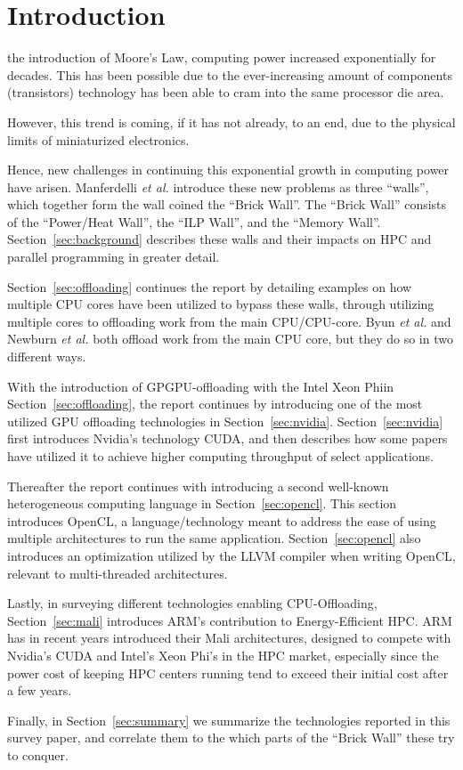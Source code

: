 
\section{Introduction}
\label{sec:intro}

 the introduction of Moore's Law\cite{Moore:2000:CMC:333067.333074}, computing power increased exponentially for decades.
This has been possible due to the ever-increasing amount of components (transistors) technology has been able to cram into the same processor die area.

However, this trend is coming, if it has not already, to an end, due to the physical limits of miniaturized electronics.

Hence, new challenges in continuing this exponential growth in computing power have arisen.
Manferdelli \textit{et al.}\cite{4484943} introduce these new problems as three ``walls'', which together form the wall coined the ``Brick Wall''.
The ``Brick Wall'' consists of the ``Power/Heat Wall'', the ``ILP Wall'', and the ``Memory Wall''.
Section~\ref{sec:background} describes these walls and their impacts on HPC and parallel programming in greater detail.

Section~\ref{sec:offloading} continues the report by detailing examples on how multiple CPU cores have been utilized to bypass these walls, through utilizing multiple cores to offloading work from the main CPU/CPU-core.
Byun \textit{et al.}\cite{Byun:EECS-2012-215} and Newburn \textit{et al.}\cite{Newburn:2013:OCR:2510648.2511038} both offload work from the main CPU core, but they do so in two different ways.

With the introduction of GPGPU-offloading with the Intel Xeon Phi\texttrademark in Section~\ref{sec:offloading}, the report continues by introducing one of the most utilized GPU offloading technologies in Section~\ref{sec:nvidia}.
Section~\ref{sec:nvidia} first introduces Nvidia's technology CUDA\texttrademark, and then describes how some papers have utilized it to achieve higher computing throughput of select applications.

Thereafter the report continues with introducing a second well-known heterogeneous computing language in Section~\ref{sec:opencl}.
This section introduces OpenCL\texttrademark, a language/technology meant to address the ease of using multiple architectures to run the same application.
Section~\ref{sec:opencl} also introduces an optimization utilized by the LLVM compiler when writing OpenCL, relevant to multi-threaded architectures.

Lastly, in surveying different technologies enabling CPU-Offloading, Section~\ref{sec:mali} introduces ARM's contribution to Energy-Efficient HPC.
ARM has in recent years introduced their Mali architectures, designed to compete with Nvidia's CUDA and Intel's Xeon Phi's in the HPC market, especially since the power cost of keeping HPC centers running tend to exceed their initial cost after a few years.

Finally, in Section~\ref{sec:summary} we summarize the technologies reported in this survey paper, and correlate them to the which parts of the ``Brick Wall'' these try to conquer.
